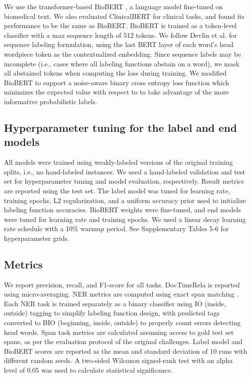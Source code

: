 \documentclass{article}
\begin{document}
We use the transformer-based BioBERT \cite{Lee2019-xt}, a language model fine-tuned on biomedical text.
We also evaluated ClinicalBERT \cite{Alsentzer2019-fg} for clinical tasks, and found its performance to be the same as BioBERT.
BioBERT is trained as a token-level classifier with a max sequence length of 512 tokens. 
We follow Devlin et al. \cite{Devlin2019-qr} for sequence labeling formulation, using the last BERT layer of each word's head wordpiece token as the contextualized embedding.
Since sequence labels may be incomplete (i.e., cases where all labeling functions abstain on a word), we mask all abstained tokens when computing the loss during training.
We modified BioBERT to support a noise-aware binary cross entropy loss function \cite{Ratner2016-so} which minimizes the expected value with respect to  to take advantage of the more informative probabilistic labels.

\subsection*{Hyperparameter tuning for the label and end models}
All models were trained using weakly-labeled versions of the original training splits, i.e., no hand-labeled instances. 
We used a hand-labeled validation and test set for hyperparameter tuning and model evaluation, respectively. Result metrics are reported using the test set. 
The label model was tuned for learning rate, training epochs, L2 regularization, and a uniform accuracy prior used to initialize labeling function accuracies. 
BioBERT weights were fine-tuned, and end models were tuned for learning rate and training epochs. 
We used a linear decay learning rate schedule with a 10\% warmup period.
See Supplementary Tables 5-6 for hyperparameter grids.


\subsection*{Metrics}
We report precision, recall, and F1-score for all tasks. 
DocTimeRela is reported using micro-averaging. 
NER metrics are computed using exact span matching \cite{Tjong_Kim2000-cm}. Each NER task is trained separately as a binary classifier using IO (inside, outside) tagging to simplify labeling function design, with predicted tags converted to BIO (beginning, inside, outside) to properly count errors detecting head words. 
Span task metrics are calculated assuming access to gold test set spans, as per the evaluation protocol of the original challenges. 
Label model and BioBERT scores are reported as the mean and standard deviation of 10 runs with different random seeds.
{A two-sided} Wilcoxon signed-rank test with an alpha level of 0.05 was used to calculate statistical significance.
\end{document}
